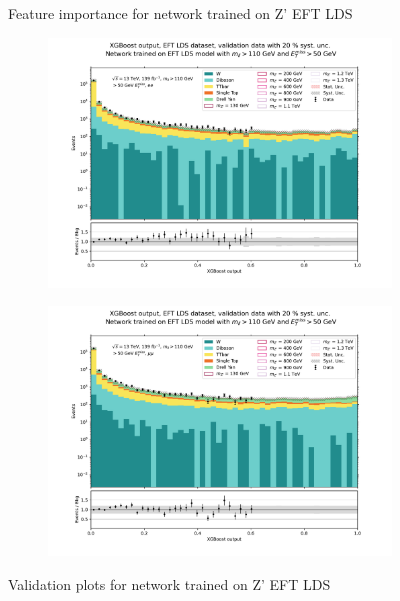 \documentclass[12pt, a4paper]{book}
\begin{document}
\begin{figure}[!ht]
\begin{subfigure}[b]{0.7\textwidth}
      \end{subfigure}
   \caption{Feature importance for network trained on Z' EFT LDS}\label{fig:EFT_LDS_feat}
\end{figure}
\begin{figure}[!ht]
	\centering
	\begin{subfigure}[b]{0.49\textwidth}
      \centering
      \includegraphics[width=1\textwidth]{XGBoost/EFT_LDS/VAL_ee.pdf}
      \end{subfigure}
   \hfill
   \begin{subfigure}[b]{0.49\textwidth}
      \centering
      \includegraphics[width=1\textwidth]{XGBoost/EFT_LDS/VAL_uu.pdf}
      \end{subfigure}
   \caption{Validation plots for network trained on Z' EFT LDS}\label{fig:EFT_LDS_vals}
\end{figure}
\end{document}
